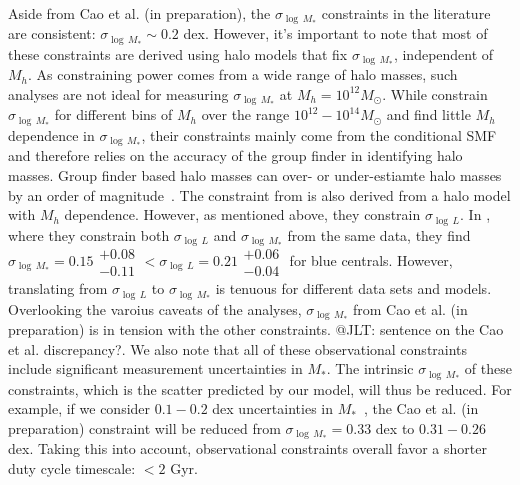 \documentclass[12pt, letterpaper, preprint, tighten]{aastex62}
\newcommand{\ch}[1]{\color{orange}{\bf CH:} #1}
\begin{document}
Aside from Cao et al. (in preparation), the $\sigma_{\log\,M_*}$ constraints 
in the literature are consistent: $\sigma_{\log\,M_*} \sim 0.2$ dex. However, 
it's important to note that most of these constraints are derived using halo
models that fix $\sigma_{\log\,M_*}$, independent of $M_h$. As constraining 
power comes from a wide range of halo masses, such analyses are not ideal 
for measuring $\sigma_{\log\,M_*}$ at $M_h=10^{12}M_\odot$. While \cite{reddick2013} 
constrain $\sigma_{\log\,M_*}$ for different bins of $M_h$ over the range 
$10^{12} - 10^{14} M_\odot$ and find little $M_h$ dependence in $\sigma_{\log\,M_*}$, 
their constraints mainly come from the conditional SMF and therefore relies on 
the accuracy of the \cite{tinker2011} group finder in identifying halo masses. 
Group finder based halo masses can over- or under-estiamte halo masses by an 
order of magnitude~\citep{old2014}. The constraint from \cite{lange2018a} is also derived from a halo model 
with $M_h$ dependence. However, as mentioned above, they constrain $\sigma_{\log\,L}$. 
In \cite{more2011}, where they constrain both $\sigma_{\log\,L}$ and $\sigma_{\log\,M_*}$ 
from the same data, they find 
$\sigma_{\log\,M_*} = 0.15\substack{+0.08\\ -0.11} < \sigma_{\log\,L} = 0.21\substack{+0.06\\ -0.04}$
for blue centrals. However, translating from $\sigma_{\log\,L}$ to 
$\sigma_{\log\,M_*}$ is tenuous for different data sets and models. Overlooking the varoius caveats of the analyses, 
$\sigma_{\log\,M_*}$ from Cao et al. (in preparation) is in tension with 
the other constraints. {\ch @JLT: sentence on the Cao et al. discrepancy?}. 
We also note that all of these observational constraints include significant measurement 
uncertainties in $M_*$. The intrinsic $\sigma_{\log\,M_*}$ of these constraints, 
which is the scatter predicted by our model, will thus be reduced. For example, 
if we consider $0.1 - 0.2$ dex uncertainties in $M_*$~\citep{roediger2015}, 
the Cao et al. (in preparation) constraint will be reduced from 
$\sigma_{\log\,M_*} = 0.33$ dex to $0.31 - 0.26$ dex. Taking this into account,  
observational constraints overall favor a shorter duty cycle timescale: $< 2$ Gyr. 
\end{document}
